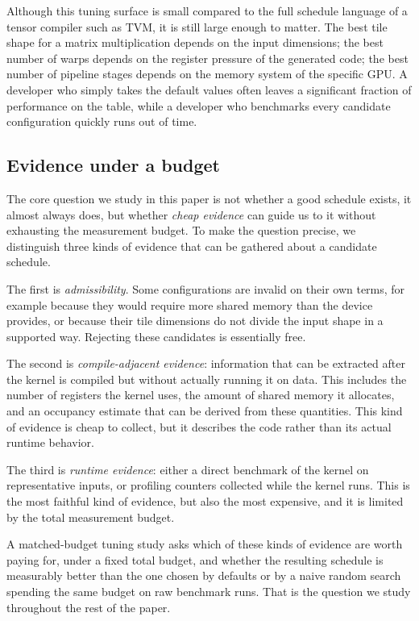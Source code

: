 Although this tuning surface is small compared to the full schedule language of a tensor compiler such as TVM, it is still large enough to matter. The best tile shape for a matrix multiplication depends on the input dimensions; the best number of warps depends on the register pressure of the generated code; the best number of pipeline stages depends on the memory system of the specific GPU. A developer who simply takes the default values often leaves a significant fraction of performance on the table, while a developer who benchmarks every candidate configuration quickly runs out of time.




\subsection{Evidence under a budget}

The core question we study in this paper is not whether a good schedule exists, it almost always does, but whether \emph{cheap evidence} can guide us to it without exhausting the measurement budget. To make the question precise, we distinguish three kinds of evidence that can be gathered about a candidate schedule.

The first is \emph{admissibility}. Some configurations are invalid on their own terms, for example because they would require more shared memory than the device provides, or because their tile dimensions do not divide the input shape in a supported way. Rejecting these candidates is essentially free.

The second is \emph{compile-adjacent evidence}: information that can be extracted after the kernel is compiled but without actually running it on data. This includes the number of registers the kernel uses, the amount of shared memory it allocates, and an occupancy estimate that can be derived from these quantities. This kind of evidence is cheap to collect, but it describes the code rather than its actual runtime behavior.

The third is \emph{runtime evidence}: either a direct benchmark of the kernel on representative inputs, or profiling counters collected while the kernel runs. This is the most faithful kind of evidence, but also the most expensive, and it is limited by the total measurement budget.

A matched-budget tuning study asks which of these kinds of evidence are worth paying for, under a fixed total budget, and whether the resulting schedule is measurably better than the one chosen by defaults or by a naive random search spending the same budget on raw benchmark runs. That is the question we study throughout the rest of the paper.

